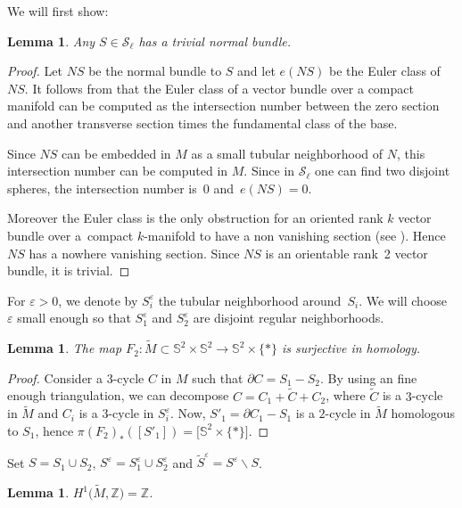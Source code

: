 \documentclass[pdftex]{sigma}
\numberwithin{equation}{section}
\newtheorem{lem}[thm]{Lemma}
\newcommand{\eps}{\varepsilon}
\begin{document}
We will first show:
\begin{lem}\label{lem-norm}
 Any $S\in \mathcal{S}_\ell$ has a trivial normal bundle.
\end{lem}
\begin{proof}
 Let $NS$ be the normal bundle to $S$ and let $e(NS)$ be the Euler
 class of~$NS$. It follows from \cite[Theorem~11.17, p.~125]{BottTu} that the Euler class of a vector bundle over a compact manifold can be computed as the intersection number between the zero section and another
 transverse section times the fundamental class of the base.

 Since $NS$ can be embedded in $M$ as a small tubular neighborhood of
 $N$, this intersection number can be computed in $M$. Since in
 $\mathcal{S}_\ell$ one can find two disjoint spheres, the
 intersection number is~0 and~$e(NS)=0$.

 Moreover the Euler class is the only obstruction for an oriented
 rank $k$ vector bundle over a~compact $k$-manifold to have a non
 vanishing section (see \cite[Proposition~3.22]{hatcher2003vector}). Hence $NS$ has a nowhere vanishing section. Since $NS$ is an
 orientable rank~2 vector bundle, it is trivial.
\end{proof}

For $\eps>0$, we denote by $S_i^\eps$ the tubular neighborhood around~$S_i$. We will choose $\eps$ small enough so that $S_1^\eps$ and
$S_2^\eps$ are disjoint regular neighborhoods.

\begin{lem}\label{lem-S2}
 The map $F_2\colon \tilde M\subset \mathbb{S}^2\times\mathbb{S}^2\to\mathbb{S}^2\times\{\ast\}$ is
 surjective in homology.
\end{lem}
\begin{proof}
 Consider a $3$-cycle $C$ in $M$ such that $\partial C= S_1-S_2$. By using
 an fine enough triangulation, we can decompose $C=C_1+\tilde C+C_2$,
 where $\tilde C$ is a $3$-cycle in $\tilde M$ and $C_i$ is a
 $3$-cycle in $S_i^\eps$. Now, $S'_1=\partial C_1-S_1$ is a $2$-cycle in
 $\tilde M$ homologous to $S_1$, hence $\pi(F_2)_*([S'_1])=\big[\mathbb{S}^2\times\{\ast\}\big]$.
\end{proof}

Set $S=S_1\cup S_2$, $S^\eps=S_1^\eps\cup S_2^\eps$ and $\tilde
S^\eps=S^\eps\backslash S$.

\begin{lem}\label{lem-H1}
 $H^1\big(\tilde M,\mathbb{Z}\big)=\mathbb{Z}$.
\end{lem}
\end{document}
